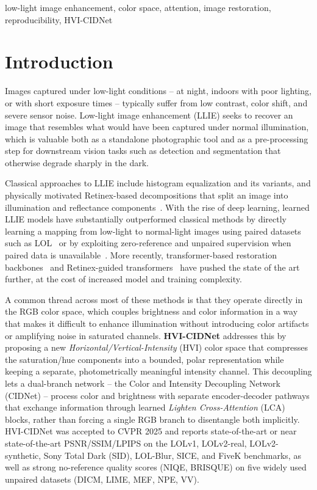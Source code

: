 \documentclass[conference]{IEEEtran}
\begin{document}
\begin{IEEEkeywords}
low-light image enhancement, color space, attention, image restoration, reproducibility, HVI-CIDNet
\end{IEEEkeywords}

\section{Introduction}

Images captured under low-light conditions -- at night, indoors with poor
lighting, or with short exposure times -- typically suffer from low contrast,
color shift, and severe sensor noise. Low-light image enhancement (LLIE)
seeks to recover an image that resembles what would have been captured under
normal illumination, which is valuable both as a standalone photographic
tool and as a pre-processing step for downstream vision tasks such as
detection and segmentation that otherwise degrade sharply in the dark.

Classical approaches to LLIE include histogram equalization and its
variants, and physically motivated Retinex-based decompositions that split an
image into illumination and reflectance components~\cite{wei2018retinexnet}.
With the rise of deep learning, learned LLIE models have substantially
outperformed classical methods by directly learning a mapping from low-light
to normal-light images using paired datasets such as LOL~\cite{wei2018retinexnet}
or by exploiting zero-reference and unpaired supervision when paired data is
unavailable~\cite{guo2020zerodce,jiang2021enlightengan}. More recently,
transformer-based restoration backbones~\cite{zamir2022restormer} and
Retinex-guided transformers~\cite{cai2023retinexformer} have pushed the
state of the art further, at the cost of increased model and training
complexity.

A common thread across most of these methods is that they operate directly
in the RGB color space, which couples brightness and color information in a
way that makes it difficult to enhance illumination without introducing color
artifacts or amplifying noise in saturated channels. \textbf{HVI-CIDNet}
\cite{yan2025hvi,feng2024hvi} addresses this by proposing a new
\emph{Horizontal/Vertical-Intensity} (HVI) color space that compresses the
saturation/hue components into a bounded, polar representation while keeping
a separate, photometrically meaningful intensity channel. This decoupling
lets a dual-branch network -- the Color and Intensity Decoupling Network
(CIDNet) -- process color and brightness with separate encoder-decoder
pathways that exchange information through learned \emph{Lighten
Cross-Attention} (LCA) blocks, rather than forcing a single RGB branch to
disentangle both implicitly. HVI-CIDNet was accepted to CVPR 2025 and reports
state-of-the-art or near state-of-the-art PSNR/SSIM/LPIPS on the LOLv1,
LOLv2-real, LOLv2-synthetic, Sony Total Dark (SID), LOL-Blur, SICE, and FiveK
benchmarks, as well as strong no-reference quality scores (NIQE, BRISQUE) on
five widely used unpaired datasets (DICM, LIME, MEF, NPE, VV).
\end{document}
